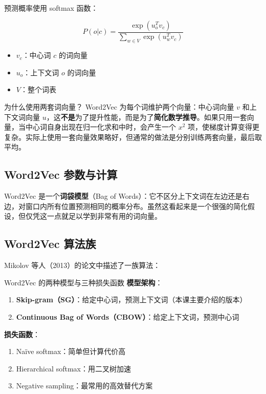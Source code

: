 \documentclass[a4paper]{article}
\begin{document}



预测概率使用 softmax 函数：

$$P(o|c) = \frac{\exp(u_o^T v_c)}{\sum_{w \in V} \exp(u_w^T v_c)}$$

\begin{itemize}
    \item $v_c$：中心词 $c$ 的词向量
    \item $u_o$：上下文词 $o$ 的词向量
    \item $V$：整个词表
\end{itemize}

\begin{knowledgebox}{为什么使用两套词向量？}
Word2Vec 为每个词维护两个向量：中心词向量 $v$ 和上下文词向量 $u$，这\textbf{不是}为了提升性能，而是为了\textbf{简化数学推导}。如果只用一套向量，当中心词自身出现在归一化求和中时，会产生一个 $x^2$ 项，使梯度计算变得更复杂。实际上使用一套向量效果略好，但通常的做法是分别训练两套向量，最后取平均。
\end{knowledgebox}

\subsection{Word2Vec 参数与计算}





Word2Vec 是一个\textbf{词袋模型}（Bag of Words）：它不区分上下文词在左边还是右边，对窗口内所有位置预测相同的概率分布。虽然这看起来是一个很强的简化假设，但仅凭这一点就足以学到非常有用的词向量。

\subsection{Word2Vec 算法族}




Mikolov 等人（2013）的论文中描述了一族算法：





\begin{importantbox}{Word2Vec 的两种模型与三种损失函数}
\textbf{模型架构}：
\begin{enumerate}
    \item \textbf{Skip-gram（SG）}：给定中心词，预测上下文词（本课主要介绍的版本）
    \item \textbf{Continuous Bag of Words（CBOW）}：给定上下文词，预测中心词
\end{enumerate}
\textbf{损失函数}：
\begin{enumerate}
    \item Na\"ive softmax：简单但计算代价高
    \item Hierarchical softmax：用二叉树加速
    \item Negative sampling：最常用的高效替代方案
\end{enumerate}
\end{importantbox}
\end{document}
